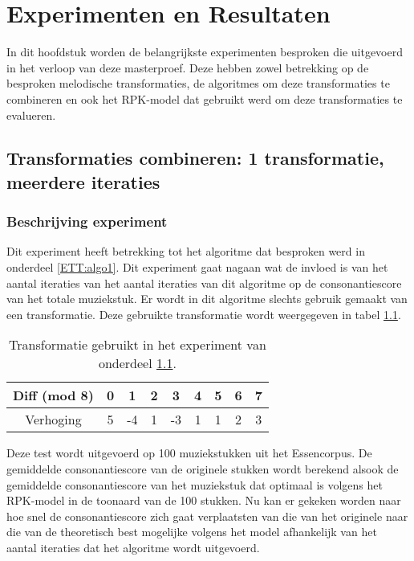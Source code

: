 \chapter{Experimenten en Resultaten}
\label{hoofdstuk:ER}
In dit hoofdstuk worden de belangrijkste experimenten besproken die uitgevoerd in het verloop van deze masterproef. Deze hebben zowel betrekking op de besproken melodische transformaties, de algoritmes om deze transformaties te combineren en ook het RPK-model dat gebruikt werd om deze transformaties te evalueren.

\section{Transformaties combineren: 1 transformatie, meerdere iteraties}
\label{experiment:1}
\subsection{Beschrijving experiment}
Dit experiment heeft betrekking tot het algoritme dat besproken werd in onderdeel \ref{ETT:algo1}. Dit experiment gaat nagaan wat de invloed is van het aantal iteraties van het aantal iteraties van dit algoritme op de consonantiescore van het totale muziekstuk. Er wordt in dit algoritme slechts gebruik gemaakt van een transformatie. Deze gebruikte transformatie wordt weergegeven in tabel \ref{tabel:exp1}.

\begin{table}
  \centering
  \begin{tabular}{c | c c c c c c c c }
    Diff (mod 8) & 0 & 1 & 2 & 3 & 4 & 5 & 6 & 7 \\
    \hline
    \hline
    Verhoging & 5 & -4 & 1 & -3 & 1 & 1 & 2 & 3 \\
  \end{tabular}
  \caption{Transformatie gebruikt in het experiment van onderdeel \ref{experiment:1}.}
  \label{tabel:exp1}
\end{table}

Deze test wordt uitgevoerd op 100 muziekstukken uit het Essencorpus. De gemiddelde consonantiescore van de originele stukken wordt berekend alsook de gemiddelde consonantiescore van het muziekstuk dat optimaal is volgens het RPK-model in de toonaard van de 100 stukken. Nu kan er gekeken worden naar hoe snel de consonantiescore zich gaat verplaatsten van die van het originele naar die van de theoretisch best mogelijke volgens het model afhankelijk van het aantal iteraties dat het algoritme wordt uitgevoerd.

